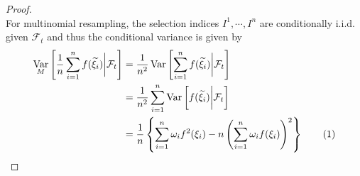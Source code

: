 \documentclass[11pt,a4,twosided,singlespacing,titlepagenumber=on]{scrreprt}
\numberwithin{equation}{chapter} %
\theoremstyle{remark}
\DeclareMathOperator{\var}{Var}
\newcommand\numberthis{\addtocounter{equation}{1}\tag{\theequation}}
\begin{document}
\begin{proof}
\cite{douc2005} \\
For multinomial resampling, the selection indices $I^1,\cdots,I^n$ are conditionally i.i.d. given $\mathcal{F}_t$ and thus the conditional variance is given by
\begin{align*}
\var_M \left[ \frac{1}{n} \sum_{i=1}^n f(\widetilde{\xi_i}) \bigg| \mathcal{F}_t \right] &= \frac{1}{n^2} \var \left[ \sum_{i=1}^n f(\widetilde{\xi_i}) \bigg| \mathcal{F}_t \right] \\
																					  &= \frac{1}{n^2} \sum_{i=1}^n \var \left[ f(\widetilde{\xi_i}) \bigg| \mathcal{F}_t \right] \\
																					  &= \frac{1}{n} \left\{\sum_{i=1}^n \omega_i f^2(\xi_i) - n \left(\sum_{i=1}^n \omega_i f(\xi_i)\right)^2\right\} \numberthis
\end{align*}


\end{proof}
\end{document}
